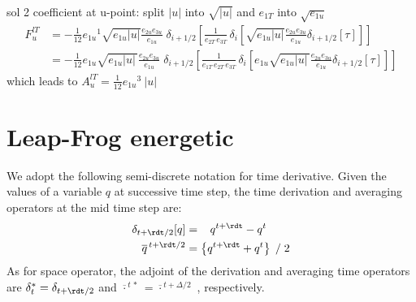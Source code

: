 sol 2 coefficient at u-point: split $|u|$ into $\sqrt{|u|}$ and $e_{1T}$ into $\sqrt{e_{1u}}$
\begin{equation} \label{Eq_tra_adv_ubs2}
\begin{split}
F_u^{lT}
&= - \frac{1}{12} {e_{1u}}^1 \sqrt{e_{1u}|u|} \frac{e_{2u} e_{3u}}{e_{1u}}\;\delta_{i+1/2}\left[ \frac{1}{e_{2T}\,e_{3T}}\,\delta _i \left[ \sqrt{e_{1u}|u|} \frac{e_{2u} e_{3u} }{e_{1u} } \delta _{i+1/2}[\tau] \right] \right] \\
&= - \frac{1}{12} e_{1u} \sqrt{e_{1u}|u|\,} \frac{e_{2u} e_{3u}}{e_{1u}}\;\delta_{i+1/2}\left[ \frac{1}{e_{1T}\,e_{2T}\,e_{3T}}\,\delta _i \left[ e_{1u} \sqrt{e_{1u}|u|\,} \frac{e_{2u} e_{3u} }{e_{1u}} \delta _{i+1/2}[\tau] \right] \right]
\end{split}
\end{equation}
which leads to ${A_u^{lT}} = \frac{1}{12} {e_{1u}}^3\ |u|$


\section{Leap-Frog energetic }
\label{LF}

We adopt the following semi-discrete notation for time derivative. Given the values of a variable $q$ at successive time step, the time derivation and averaging operators at the mid time step are:
\begin{subequations} \label{dt_mt}
\begin{align}
 \delta _{t+\rdt/2} [q]     &=  \  \ \,   q^{t+\rdt}  - q^{t}		\\
 \overline q^{\,t+\rdt/2} &= \left\{ q^{t+\rdt} + q^{t} \right\} \; / \; 2
\end{align}
\end{subequations}
As for space operator, the adjoint of the derivation and averaging time operators are 
$\delta_t^*=\delta_{t+\rdt/2}$ and $\overline{\cdot}^{\,t\,*}= \overline{\cdot}^{\,t+\Delta/2}$
, respectively. 

